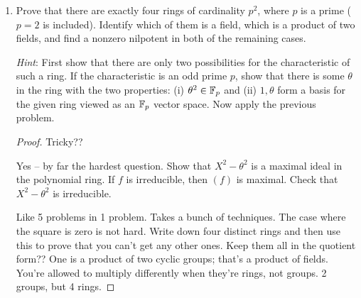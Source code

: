\documentclass[../psets.tex]{subfiles}
\begin{document}
\begin{enumerate}
\begin{enumerate}[label={(\roman*)}]
\begin{proof}
            There are $p-1$ nonzero elements in $\F_p$. Although we usually think of these elements as $1,\dots,p-1$, we can divide this list in two and consider instead the congruent elements
            \begin{equation*}
                -\frac{p-1}{2},\dots,-1,1,\dots,\frac{p-1}{2}
            \end{equation*}
            Note that it is the fact that $p\geq 3$ is an odd prime that allows us to divide $p-1$ (necessarily an even number) by 2 and still obtain a (nonzero) integer. Continuing, we can rearrange the list in this way because $a\equiv b\bmod p$ implies $a^2\equiv b^2\bmod p$, so it will not affect our operation of choice. Additionally, the boon is that choosing negative elements makes it very easy to see that $a^2=(-a)^2$ for each $a\in\{1,\dots,(p-1)/2\}$. Therefore, for the $p-1$ elements in the above list, there are only $(p-1)/2$ squares: One for each distinct absolute value of an entry in the above list, as desired.
        \end{proof}
    \end{enumerate}
    \item Prove that there are exactly four rings of cardinality $p^2$, where $p$ is a prime ($p=2$ is included). Identify which of them is a field, which is a product of two fields, and find a nonzero nilpotent in both of the remaining cases.\par
    \emph{Hint}: First show that there are only two possibilities for the characteristic of such a ring. If the characteristic is an odd prime $p$, show that there is some $\theta$ in the ring with the two properties: (i) $\theta^2\in\mathbb{F}_p$ and (ii) $1,\theta$ form a basis for the given ring viewed as an $\F_p$ vector space. Now apply the previous problem.
    \begin{proof}
        Tricky??

        Yes -- by far the hardest question. Show that $X^2-\theta^2$ is a maximal ideal in the polynomial ring. If $f$ is irreducible, then $(f)$ is maximal. Check that $X^2-\theta^2$ is irreducible.

        Like 5 problems in 1 problem. Takes a bunch of techniques. The case where the square is zero is not hard. Write down four distinct rings and then use this to prove that you can't get any other ones. Keep them all in the quotient form?? One is a product of two cyclic groups; that's a product of fields. You're allowed to multiply differently when they're rings, not groups. 2 groups, but 4 rings.
    \end{proof}
\end{enumerate}
\end{document}
